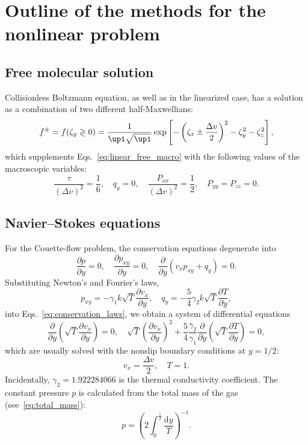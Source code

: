 \documentclass[final]{jfm} %
\newcommand{\dd}{\mathrm{d}}
\newcommand{\pder}[2][]{\frac{\partial#1}{\partial#2}}
\begin{document}
\section{Outline of the methods for the nonlinear problem}

\subsection{Free molecular solution}

Collisionless Boltzmann equation, as well as in the linearized case,
has a solution as a combination of two different half-Maxwellians:
\begin{equation}\label{eq:free_solution}
    f^\pm = f(\zeta_y \gtrless 0) =
        \frac1{\upi\sqrt{\upi}} \exp\left[-\left(\zeta_x\pm\frac{\Delta{v}}2\right)^2 - \zeta_y^2 - \zeta_z^2\right],
\end{equation}
which supplements Eqs.~\eqref{eq:linear_free_macro} with the following values of the macroscopic variables:
\begin{equation}\label{eq:free_macro}
    \frac{\tau}{(\Delta{v})^2} = \frac16, \quad q_y = 0, \quad
    \frac{P_{xx}}{(\Delta{v})^2} = \frac12, \quad P_{yy} = P_{zz} = 0.
\end{equation}

\subsection{Navier--Stokes equations}\label{sec:Navier-Stokes}

For the Couette-flow problem, the conservation equations degenerate into
\begin{equation}\label{eq:conservation_laws}
    \pder[p]{y} = 0, \quad \pder[p_{xy}]{y} = 0, \quad \pder{y}(v_x p_{xy} + q_y) = 0.
\end{equation}
Substituting Newton's and Fourier's laws,
\begin{equation}\label{eq:Newton-Fourier}
    p_{xy} = -\gamma_1 k\sqrt{T}\pder[v_x]{y}, \quad q_y = -\frac54\gamma_2 k\sqrt{T}\pder[T]{y},
\end{equation}
into Eqs.~\eqref{eq:conservation_laws}, we obtain a system of differential equations
\begin{equation}\label{eq:Navier-Stokes}
    \pder{y}\left(\sqrt{T}\pder[v_x]{y}\right) = 0, \quad
    \sqrt{T}\left(\pder[v_x]{y}\right)^2 + \frac54\frac{\gamma_2}{\gamma_1}\pder{y}\left(\sqrt{T}\pder[T]{y}\right) = 0,
\end{equation}
which are usually solved with the nonslip boundary conditions at \(y=1/2\):
\begin{equation}\label{eq:nonslip_bc}
    v_x = \frac{\Delta{v}}2, \quad T = 1.
\end{equation}
Incidentally, \(\gamma_2 = 1.922284066\) is the thermal conductivity coefficient.
The constant pressure \(p\) is calculated from the total mass of the gas (see~\eqref{eq:total_mass}):
\begin{equation}\label{eq:constant_pressure}
    p = \left( 2\int_{0}^\frac12\frac{\dd{y}}{T} \right)^{-1}.
\end{equation}
\end{document}
